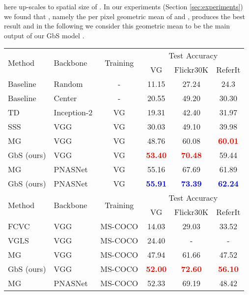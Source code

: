 \documentclass[10pt,twocolumn,letterpaper]{article}
\def\oursspace{{GbS }}
\begin{document}
here  up-scales to spatial size of . In our experiments (Section \ref{sec:experiments}) we found that , namely the per pixel geometric mean of  and , produces the best result and in the following we consider this geometric mean to be the main output of our \oursspace model .








\begin{table*}[t]
\begin{center}
\begin{tabular}{ llcccc }
\toprule
 \multirow{2}{*}{Method} & \multirow{2}{*}{Backbone} & \multirow{2}{*}{Training} & \multicolumn{3}{c}{ Test Accuracy}\\


  &  &  & VG & Flickr30K & ReferIt\\ 
 \midrule
 Baseline & Random & - & 11.15 & 27.24 & 24.3 \\  
 Baseline & Center & - & 20.55 & 49.20 & 30.30 \\
 \midrule
 TD \cite{zhang2018top} & Inception-2 & VG & 19.31 & 42.40 & 31.97 \\
 SSS \cite{javed2018learning} & VGG & VG & 30.03 & 49.10 & 39.98 \\
 MG \cite{akbari2019multi} & VGG & VG & 48.76 & 60.08 & \textcolor{red}{\textbf{60.01}} \\
 \oursspace  (ours) & VGG & VG & \textcolor{red}{\textbf{53.40}} & \textcolor{red}{\textbf{70.48}} & 59.44\\
 \midrule
 MG \cite{akbari2019multi} & PNASNet & VG & 55.16 & 67.69 & 61.89 \\
\oursspace (ours) & PNASNet & VG &\textcolor{blue}{\textbf{55.91}}& \textcolor{blue}{\textbf{73.39}} & \textcolor{blue}{\textbf{62.24}}\\
 \midrule
  \midrule
 \multirow{2}{*}{Method} & \multirow{2}{*}{Backbone} & \multirow{2}{*}{Training} & \multicolumn{3}{c}{ Test Accuracy}\\
 &  &  & VG & Flickr30K & ReferIt\\ 
 \midrule
 FCVC \cite{fang2015captions} & VGG & MS-COCO & 14.03 & 29.03 & 33.52 \\
 VGLS \cite{xiao2017weakly} & VGG &  MS-COCO & 24.40 & - & - \\
 MG \cite{akbari2019multi} & VGG &  MS-COCO & 47.94 & 61.66 & 47.52 \\
 \oursspace  (ours) & VGG &  MS-COCO & \textcolor{red}{\textbf{52.00}} & \textcolor{red}{\textbf{72.60}} & \textcolor{red}{\textbf{56.10}} \\
 \midrule
 MG \cite{akbari2019multi} & PNASNet &  MS-COCO & 52.33 & 69.19 & 48.42 \\



\end{tabular}
\end{center}
\end{table*}
\end{document}
